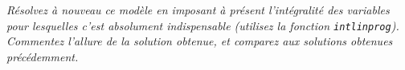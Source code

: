\question %
\emph{Résolvez à nouveau ce modèle en imposant à présent l'intégralité des
variables pour lesquelles c'est absolument indispensable 
(utilisez la fonction \texttt{intlinprog}). 
Commentez l'allure de la solution obtenue, 
et comparez aux solutions obtenues précédemment.}
